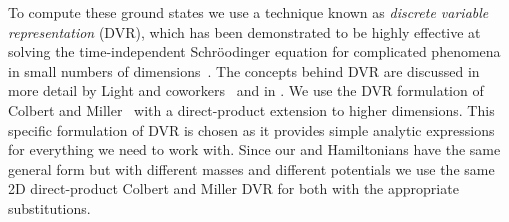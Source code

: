 %
%

To compute these ground states we use a technique known as \textit{discrete variable representation} (DVR), which has been demonstrated to be highly effective at solving the time-independent Schr{\"o}odinger equation for complicated phenomena in small numbers of dimensions~\cite{Light2007}. The concepts behind DVR are discussed in more detail by Light and coworkers~\cite{Light2007} and in . We use the DVR formulation of Colbert and Miller~\cite{Colbert1992} with a direct-product extension to higher dimensions. This specific formulation of DVR is chosen as it provides simple analytic expressions for everything we need to work with. Since our \hplus{} and \htwo{} Hamiltonians have the same general form but with different masses and different potentials we use the same 2D direct-product Colbert and Miller DVR for both with the appropriate substitutions.

%
